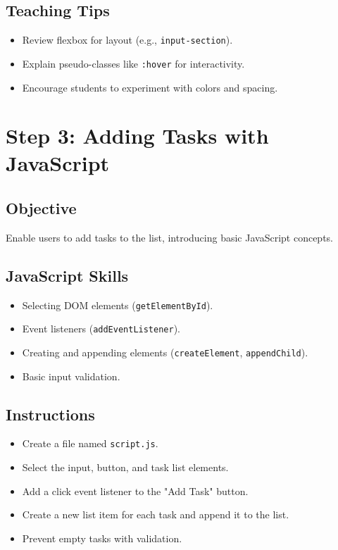 \documentclass[a4paper,12pt]{article}
\begin{document}
\subsection{Teaching Tips}
\begin{itemize}
    \item Review flexbox for layout (e.g., \texttt{input-section}).
    \item Explain pseudo-classes like \texttt{:hover} for interactivity.
    \item Encourage students to experiment with colors and spacing.
\end{itemize}

\section{Step 3: Adding Tasks with JavaScript}
\subsection{Objective}
Enable users to add tasks to the list, introducing basic JavaScript concepts.

\subsection{JavaScript Skills}
\begin{itemize}
    \item Selecting DOM elements (\texttt{getElementById}).
    \item Event listeners (\texttt{addEventListener}).
    \item Creating and appending elements (\texttt{createElement}, \texttt{appendChild}).
    \item Basic input validation.
\end{itemize}

\subsection{Instructions}
\begin{itemize}
    \item Create a file named \texttt{script.js}.
    \item Select the input, button, and task list elements.
    \item Add a click event listener to the "Add Task" button.
    \item Create a new list item for each task and append it to the list.
    \item Prevent empty tasks with validation.
\end{itemize}
\end{document}
